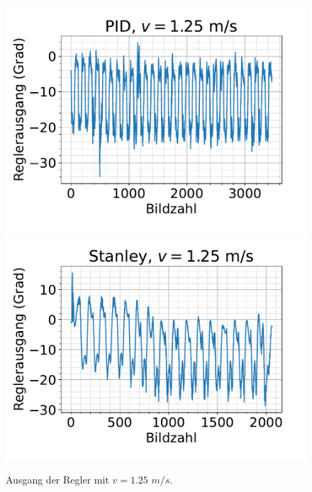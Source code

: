\documentclass[arbeit=studie,oneside,BCOR=12mm]{ArbeitRST}
\begin{document}
\begin{figure}[h]
    \centering
    \includegraphics[scale=0.47]{pid1.25}
    \includegraphics[scale=0.47]{Stan1.25}
    \caption{Ausgang der Regler mit $v = 1.25$ $m/s$.}
    \label{reg:1.25}
\end{figure}
\end{document}
